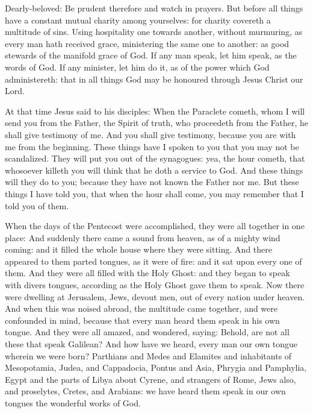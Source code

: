 


Dearly-beloved: %
Be prudent therefore and watch in prayers.  But
before all things have a constant mutual charity among yourselves: for charity
covereth a multitude of sins.  Using hospitality one towards another, without
murmuring, as every man hath received grace, ministering the same one to
another: as good stewards of the manifold grace of God.  If any man speak, let
him speak, as the words of God. If any minister, let him do it, as of the power
which God administereth: that in all things God may be honoured through Jesus
Christ our Lord.%



At that time Jesus said to his disciples:
When the Paraclete cometh, whom I will send you from the Father, the Spirit
of truth, who proceedeth from the Father, he shall give testimony of me.
 And you shall give testimony, because you are
with me from the beginning.  These things have I
spoken to you that you may not be scandalized.  They will put you out of the
synagogues: yea, the hour cometh, that whosoever killeth you will think that he
doth a service to God.  And these things will they do to you; because they have
not known the Father nor me.  But these things I have told you, that when the
hour shall come, you may remember that I told you of them.




When the days of the Pentecost were accomplished, they were all together in
one place: And suddenly there came a sound from heaven, as of a mighty wind
coming: and it filled the whole house where they were sitting.  And there
appeared to them parted tongues, as it were of fire: and it sat upon every one
of them.  And they were all filled with the Holy Ghost: and they began to speak
with divers tongues, according as the Holy Ghost gave them to speak.  Now there
were dwelling at Jerusalem, Jews, devout men, out of every nation under heaven.
And when this was noised abroad, the multitude came together, and were
confounded in mind, because that every man heard them speak in his own tongue.
And they were all amazed, and wondered, saying: Behold, are not all these that
speak Galilean?  And how have we heard, every man our own tongue wherein we
were born?  Parthians and Medes and Elamites and inhabitants of Mesopotamia,
Judea, and Cappadocia, Pontus and Asia, Phrygia and Pamphylia, Egypt and the
parts of Libya about Cyrene, and strangers of Rome, Jews also, and proselytes,
Cretes, and Arabians: we have heard them speak in our own tongues the wonderful
works of God.



